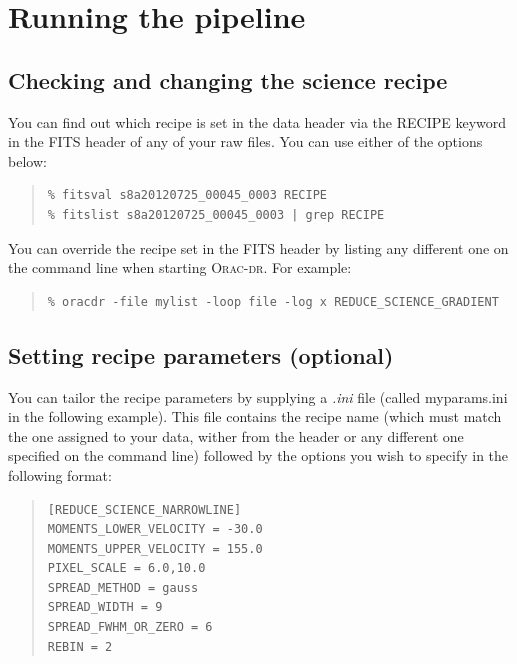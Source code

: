 \documentclass[twoside,11pt]{article}
\newcommand{\htmladdnormallink}[2]{#1}
\newcommand{\xlabel}[1]{}
\renewcommand{\_}{\texttt{\symbol{95}}}
\newenvironment{myquote}{
   \color{MidnightBlue}\begin{quote}\begin{small}}{
   \end{small}\end{quote}
}
\newcommand{\oracdr}{\htmladdnormallink{\textsc{Orac-dr}}{http://www.oracdr.org/oracdr}}
\renewenvironment{myquote}{
      \begin{quote}\begin{small}}{
      \end{small}\end{quote}
   }
\begin{document}
\clearpage
\section{\xlabel{running_pl}Running the pipeline}
\label{sec:runpipe}

\subsection{Checking and changing the science recipe}
\label{sec:changerecipe}
You can find out which recipe is set in the data header via the RECIPE keyword in the FITS header of any of your raw files.  You can use either of the options below:
\begin{myquote}
\begin{verbatim}
% fitsval s8a20120725_00045_0003 RECIPE
% fitslist s8a20120725_00045_0003 | grep RECIPE
\end{verbatim}
\end{myquote}

You can override the recipe set in the FITS header by listing any different
one on the command line when starting \oracdr. For example:
\begin{myquote}
\begin{verbatim}
% oracdr -file mylist -loop file -log x REDUCE_SCIENCE_GRADIENT
\end{verbatim}
\end{myquote}

\subsection{Setting recipe parameters (optional)}
\label{sec:recpars}
You can tailor the recipe parameters by supplying a  \textit{.ini} file (called myparams.ini in the following example). This file contains the recipe name (which must match the one assigned to your data, wither from the header or any different one specified on the command line) followed by the options you wish to specify in the following format:

\vspace{0.2cm}
\begin{quote}
\begin{verbatim}
[REDUCE_SCIENCE_NARROWLINE]
MOMENTS_LOWER_VELOCITY = -30.0
MOMENTS_UPPER_VELOCITY = 155.0
PIXEL_SCALE = 6.0,10.0
SPREAD_METHOD = gauss
SPREAD_WIDTH = 9
SPREAD_FWHM_OR_ZERO = 6
REBIN = 2
\end{verbatim}
\end{quote}
\end{document}
